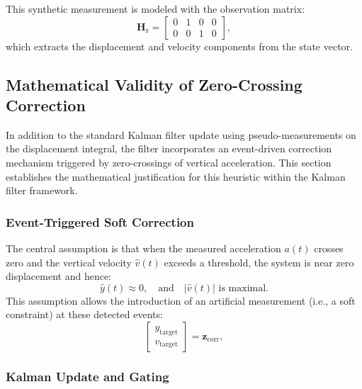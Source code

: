 \documentclass[11pt,letterpaper]{article}
\begin{document}
This synthetic measurement is modeled with the observation matrix:
\begin{equation}
    \bm{H}_\mathrm{z} = 
    \begin{bmatrix}
        0 & 1 & 0 & 0 \\
        0 & 0 & 1 & 0
    \end{bmatrix},
\end{equation}
which extracts the displacement and velocity components from the state vector.


\subsection{Mathematical Validity of Zero-Crossing Correction}

In addition to the standard Kalman filter update using pseudo-measurements on the displacement integral, the filter incorporates an event-driven correction mechanism triggered by zero-crossings of vertical acceleration. This section establishes the mathematical justification for this heuristic within the Kalman filter framework.

\subsubsection*{Event-Triggered Soft Correction}

The central assumption is that when the measured acceleration $a(t)$ crosses zero and the vertical velocity $\hat{v}(t)$ exceeds a threshold, the system is near zero displacement and hence:
\begin{equation}
    \hat{y}(t) \approx 0, \quad \text{and} \quad |\hat{v}(t)| \text{ is maximal}.
\end{equation}
This assumption allows the introduction of an artificial measurement (i.e., a soft constraint) at these detected events:
\begin{equation}
    \begin{bmatrix}
        y_\mathrm{target} \\
        v_\mathrm{target}
    \end{bmatrix}
    = \bm{z}_\mathrm{\text{corr}},
\end{equation}

\subsubsection*{Kalman Update and Gating}
\end{document}
